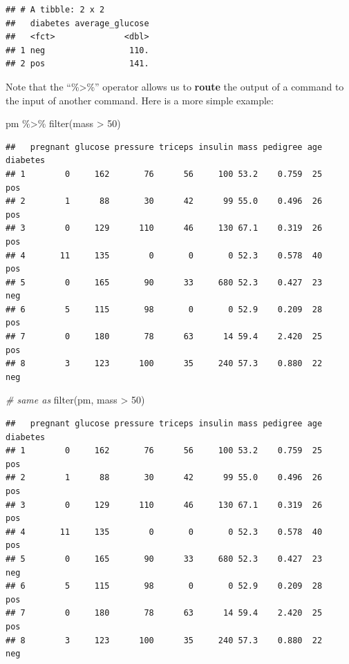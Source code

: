 \documentclass[
]{article}
\newenvironment{Shaded}{\begin{snugshade}}{\end{snugshade}}
\newcommand{\CommentTok}[1]{\textcolor[rgb]{0.56,0.35,0.01}{\textit{#1}}}
\newcommand{\DecValTok}[1]{\textcolor[rgb]{0.00,0.00,0.81}{#1}}
\newcommand{\FunctionTok}[1]{\textcolor[rgb]{0.00,0.00,0.00}{#1}}
\newcommand{\NormalTok}[1]{#1}
\newcommand{\SpecialCharTok}[1]{\textcolor[rgb]{0.00,0.00,0.00}{#1}}
\begin{document}
\begin{verbatim}
## # A tibble: 2 x 2
##   diabetes average_glucose
##   <fct>              <dbl>
## 1 neg                 110.
## 2 pos                 141.
\end{verbatim}

Note that the ``\%\textgreater\%'' operator allows us to \textbf{route}
the output of a command to the input of another command. Here is a more
simple example:

\begin{Shaded}
\begin{Highlighting}[]
\NormalTok{pm }\SpecialCharTok{\%\textgreater{}\%} \FunctionTok{filter}\NormalTok{(mass }\SpecialCharTok{\textgreater{}} \DecValTok{50}\NormalTok{)}
\end{Highlighting}
\end{Shaded}

\begin{verbatim}
##   pregnant glucose pressure triceps insulin mass pedigree age diabetes
## 1        0     162       76      56     100 53.2    0.759  25      pos
## 2        1      88       30      42      99 55.0    0.496  26      pos
## 3        0     129      110      46     130 67.1    0.319  26      pos
## 4       11     135        0       0       0 52.3    0.578  40      pos
## 5        0     165       90      33     680 52.3    0.427  23      neg
## 6        5     115       98       0       0 52.9    0.209  28      pos
## 7        0     180       78      63      14 59.4    2.420  25      pos
## 8        3     123      100      35     240 57.3    0.880  22      neg
\end{verbatim}

\begin{Shaded}
\begin{Highlighting}[]
\CommentTok{\# same as}
\FunctionTok{filter}\NormalTok{(pm, mass }\SpecialCharTok{\textgreater{}} \DecValTok{50}\NormalTok{)}
\end{Highlighting}
\end{Shaded}

\begin{verbatim}
##   pregnant glucose pressure triceps insulin mass pedigree age diabetes
## 1        0     162       76      56     100 53.2    0.759  25      pos
## 2        1      88       30      42      99 55.0    0.496  26      pos
## 3        0     129      110      46     130 67.1    0.319  26      pos
## 4       11     135        0       0       0 52.3    0.578  40      pos
## 5        0     165       90      33     680 52.3    0.427  23      neg
## 6        5     115       98       0       0 52.9    0.209  28      pos
## 7        0     180       78      63      14 59.4    2.420  25      pos
## 8        3     123      100      35     240 57.3    0.880  22      neg
\end{verbatim}
\end{document}
